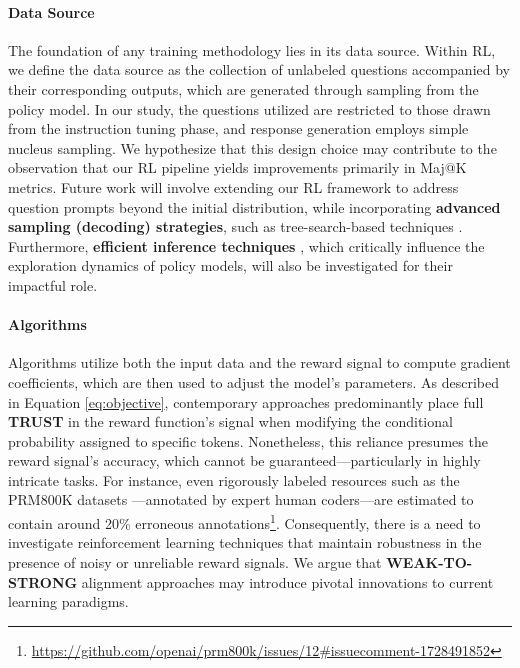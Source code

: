 \begin{itemize}[topsep=0pt]
\begin{itemize}[topsep=0pt]
\paragraph{Data Source} The foundation of any training methodology lies in its data source. Within RL, we define the data source as the collection of unlabeled questions accompanied by their corresponding outputs, which are generated through sampling from the policy model. In our study, the questions utilized are restricted to those drawn from the instruction tuning phase, and response generation employs simple nucleus sampling. We hypothesize that this design choice may contribute to the observation that our RL pipeline yields improvements primarily in Maj@K metrics. Future work will involve extending our RL framework to address question prompts beyond the initial distribution, while incorporating \textbf{advanced sampling (decoding) strategies}, such as tree-search-based techniques \citep{yao2023tree}. Furthermore, \textbf{efficient inference techniques} \citep{xia-etal-2023-speculative,leviathan2023fast,kwon2023efficient,xia2024unlocking}, which critically influence the exploration dynamics of policy models, will also be investigated for their impactful role.

\paragraph{Algorithms} Algorithms utilize both the input data and the reward signal to compute gradient coefficients, which are then used to adjust the model’s parameters. As described in Equation \ref{eq:objective}, contemporary approaches predominantly place full \textbf{TRUST} in the reward function’s signal when modifying the conditional probability assigned to specific tokens. Nonetheless, this reliance presumes the reward signal's accuracy, which cannot be guaranteed—particularly in highly intricate tasks. For instance, even rigorously labeled resources such as the PRM800K datasets \citep{lightman2023let}—annotated by expert human coders—are estimated to contain around 20\% erroneous annotations\footnote{\url{https://github.com/openai/prm800k/issues/12\#issuecomment-1728491852}}. Consequently, there is a need to investigate reinforcement learning techniques that maintain robustness in the presence of noisy or unreliable reward signals. We argue that \textbf{WEAK-TO-STRONG} alignment approaches \citep{burns2023weak} may introduce pivotal innovations to current learning paradigms.


\end{itemize}
\end{itemize}

